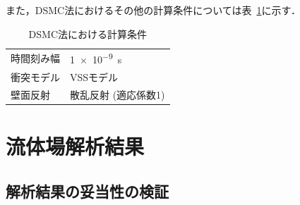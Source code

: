 また，DSMC法におけるその他の計算条件については表~\ref{tab:dsmc-setup}に示す．

\begin{table}[H]
    \centering
    \caption{DSMC法における計算条件}
    \begin{tabular}{ll}
        \hline\hline
        時間刻み幅 & \SI{1e-9}{s} \\
        衝突モデル & VSSモデル \\
        壁面反射 & 散乱反射 (適応係数1) \\
        \hline\hline
    \end{tabular}
    \label{tab:dsmc-setup}
\end{table}

\newpage
\section{流体場解析結果}
\subsection{解析結果の妥当性の検証}

